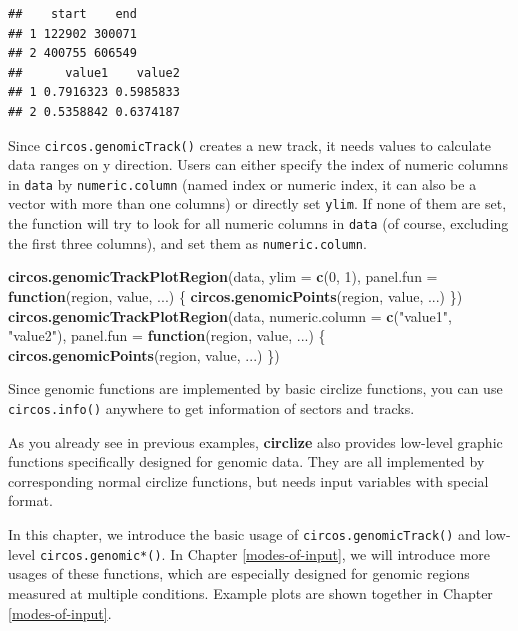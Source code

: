 \documentclass[]{book}
\newenvironment{Shaded}{\begin{snugshade}}{\end{snugshade}}
\newcommand{\KeywordTok}[1]{\textcolor[rgb]{0.13,0.29,0.53}{\textbf{#1}}}
\newcommand{\DataTypeTok}[1]{\textcolor[rgb]{0.13,0.29,0.53}{#1}}
\newcommand{\DecValTok}[1]{\textcolor[rgb]{0.00,0.00,0.81}{#1}}
\newcommand{\StringTok}[1]{\textcolor[rgb]{0.31,0.60,0.02}{#1}}
\newcommand{\ControlFlowTok}[1]{\textcolor[rgb]{0.13,0.29,0.53}{\textbf{#1}}}
\newcommand{\NormalTok}[1]{#1}
\begin{document}
\begin{verbatim}
##    start    end
## 1 122902 300071
## 2 400755 606549
##      value1    value2
## 1 0.7916323 0.5985833
## 2 0.5358842 0.6374187
\end{verbatim}

Since \texttt{circos.genomicTrack()} creates a new track, it needs
values to calculate data ranges on y direction. Users can either specify
the index of numeric columns in \texttt{data} by \texttt{numeric.column}
(named index or numeric index, it can also be a vector with more than
one columns) or directly set \texttt{ylim}. If none of them are set, the
function will try to look for all numeric columns in \texttt{data} (of
course, excluding the first three columns), and set them as
\texttt{numeric.column}.

\begin{Shaded}
\begin{Highlighting}[]
\KeywordTok{circos.genomicTrackPlotRegion}\NormalTok{(data, }\DataTypeTok{ylim =} \KeywordTok{c}\NormalTok{(}\DecValTok{0}\NormalTok{, }\DecValTok{1}\NormalTok{),}
    \DataTypeTok{panel.fun =} \ControlFlowTok{function}\NormalTok{(region, value, ...) \{}
        \KeywordTok{circos.genomicPoints}\NormalTok{(region, value, ...)}
\NormalTok{\})}
\KeywordTok{circos.genomicTrackPlotRegion}\NormalTok{(data, }\DataTypeTok{numeric.column =} \KeywordTok{c}\NormalTok{(}\StringTok{"value1"}\NormalTok{, }\StringTok{"value2"}\NormalTok{), }
    \DataTypeTok{panel.fun =} \ControlFlowTok{function}\NormalTok{(region, value, ...) \{}
        \KeywordTok{circos.genomicPoints}\NormalTok{(region, value, ...)}
\NormalTok{\})}
\end{Highlighting}
\end{Shaded}

Since genomic functions are implemented by basic circlize functions, you
can use \texttt{circos.info()} anywhere to get information of sectors
and tracks.

As you already see in previous examples, \textbf{circlize} also provides
low-level graphic functions specifically designed for genomic data. They
are all implemented by corresponding normal circlize functions, but
needs input variables with special format.

In this chapter, we introduce the basic usage of
\texttt{circos.genomicTrack()} and low-level \texttt{circos.genomic*()}.
In Chapter \ref{modes-of-input}, we will introduce more usages of these
functions, which are especially designed for genomic regions measured at
multiple conditions. Example plots are shown together in Chapter
\ref{modes-of-input}.
\end{document}
